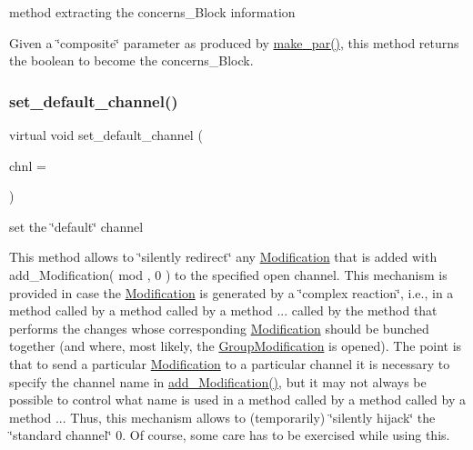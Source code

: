 method extracting the concerns\+\_\+\+Block information 

Given a \char`\"{}composite\char`\"{} parameter as produced by \mbox{\hyperlink{class_s_m_spp__di__unipi__it_1_1_observer_a2d499ae38e5e95cf66cd71da32b0694a}{make\+\_\+par()}}, this method returns the boolean to become the concerns\+\_\+\+Block. \mbox{\label{class_s_m_spp__di__unipi__it_1_1_observer_a47f7642288d3e09ad9c792f86797840d}} 
\subsubsection{\texorpdfstring{set\+\_\+default\+\_\+channel()}{set\_default\_channel()}}
{\footnotesize\ttfamily virtual void set\+\_\+default\+\_\+channel (\begin{DoxyParamCaption}\item[{\mbox{\hyperlink{class_s_m_spp__di__unipi__it_1_1_observer_aa9ad8de42ffaf90023bfed5c085ad8bc}{c\+\_\+\+Chnl\+Name}}}]{chnl = {} }\end{DoxyParamCaption})\hspace{0.3cm}{\ttfamily [pure virtual]}}



set the \char`\"{}default\char`\"{} channel 

This method allows to \char`\"{}silently redirect\char`\"{} any \mbox{\hyperlink{class_s_m_spp__di__unipi__it_1_1_modification}{Modification}} that is added with add\+\_\+\+Modification( mod , 0 ) to the specified open channel. This mechanism is provided in case the \mbox{\hyperlink{class_s_m_spp__di__unipi__it_1_1_modification}{Modification}} is generated by a \char`\"{}complex reaction\char`\"{}, i.\+e., in a method called by a method called by a method ... called by the method that performs the changes whose corresponding \mbox{\hyperlink{class_s_m_spp__di__unipi__it_1_1_modification}{Modification}} should be bunched together (and where, most likely, the \mbox{\hyperlink{class_s_m_spp__di__unipi__it_1_1_group_modification}{Group\+Modification}} is opened). The point is that to send a particular \mbox{\hyperlink{class_s_m_spp__di__unipi__it_1_1_modification}{Modification}} to a particular channel it is necessary to specify the channel name in \mbox{\hyperlink{class_s_m_spp__di__unipi__it_1_1_observer_a4ac2234c8026ccbe13860a33fc4ef14e}{add\+\_\+\+Modification()}}, but it may not always be possible to control what name is used in a method called by a method called by a method ... Thus, this mechanism allows to (temporarily) \char`\"{}silently hijack\char`\"{} the \char`\"{}standard channel\char`\"{} 0. Of course, some care has to be exercised while using this.

